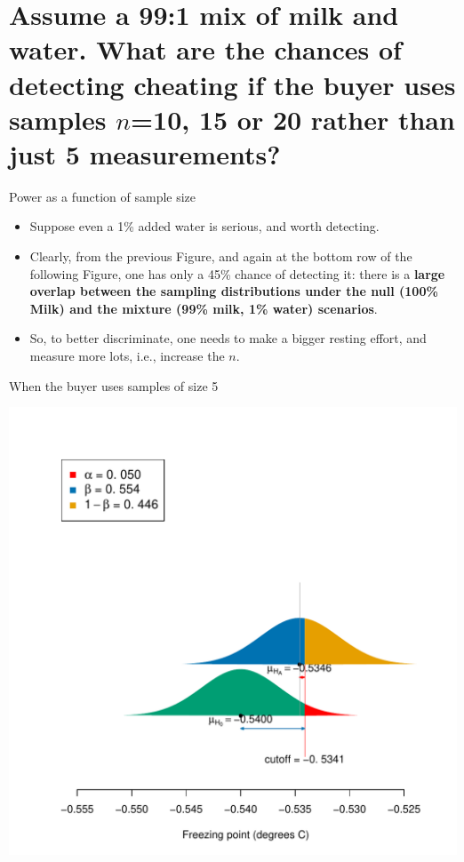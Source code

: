 \documentclass[10pt,handout]{beamer}\usepackage[]{graphicx}\usepackage[]{color}
\makeatletter
\def\maxwidth{ %
  \ifdim\Gin@nat@width>\linewidth
    \linewidth
  \else
    \Gin@nat@width
  \fi
}
\newenvironment{knitrout}{}{} %
\makeatother
\begin{document}
\section{Assume a 99:1 mix of milk and water. What are the chances of detecting cheating if the buyer uses samples $n$=10, 15 or 20 rather than just 5 measurements?}

\begin{frame}{Power as a function of sample size}
	
	\begin{itemize}
		\setlength\itemsep{1em}
		\item Suppose even a 1\% added water is serious, and worth detecting.
		\item Clearly, from the previous Figure, and again at the bottom row of the following Figure,
		one has only a 45\% chance of detecting it: there is a \textbf{large overlap between the sampling distributions under the null (100\% Milk) and the mixture (99\% milk, 1\% water) scenarios}. \pause 
		
		\item So, to better discriminate, one needs to make a bigger resting effort, and measure more lots,
		i.e., increase the $n$.
	\end{itemize}
\end{frame}


\begin{frame}[fragile]{When the buyer uses samples of size 5}

	
	
\begin{knitrout}\tiny
{}\color{fgcolor}

{\centering \includegraphics[width=\maxwidth]{figure/unnamed-chunk-12-1} 

}


\end{knitrout}
\end{frame}
\end{document}
